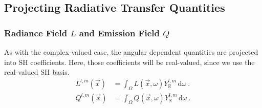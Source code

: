 \documentclass{egpubl}
\newcommand{\ud}{\,\mathrm{d}} %
\newcommand{\SHBR}{Y_{\mathbb{R}}} %
\begin{document}
\subsection{Projecting Radiative Transfer Quantities}

\subsubsection{Radiance Field $L$ and Emission Field $Q$}
\label{sec:real_proj_L}

As with the complex-valued case, the angular dependent quantities are projected into SH coefficients. Here, those coefficients will be real-valued, since we use the real-valued SH basis.
\begin{align}
L^{l,m}\left(\vec{x}\right)
&=
\int_\Omega{L\left(\vec{x}, \omega\right)\SHBR^{l,m}\ud\omega} \ . \nonumber\\
Q^{l,m}\left(\vec{x}\right)
&=
\int_\Omega{Q\left(\vec{x}, \omega\right)\SHBR^{l,m}\ud\omega} \ . \nonumber
\end{align}
\end{document}
